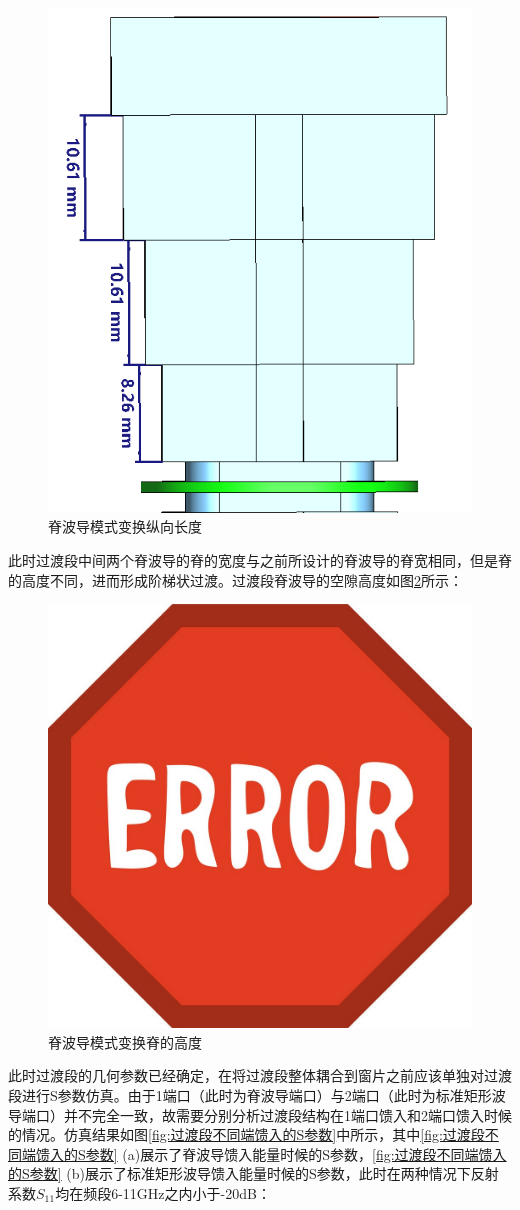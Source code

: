 \documentclass[master]{thesis-uestc}
\begin{document}
\begin{figure}[!htb]
    \centering
    \includegraphics[width=0.5\linewidth]{pic/chapter3/模式变换纵向长度.png}
    \caption{脊波导模式变换纵向长度}
    \label{fig:脊波导模式变换纵向长度}
\end{figure}
此时过渡段中间两个脊波导的脊的宽度与之前所设计的脊波导的脊宽相同，但是脊的高度不同，进而形成阶梯状过渡。过渡段脊波导的空隙高度如图\ref{fig:脊波导模式变换脊的高度}所示：
\begin{figure}[!htb]
    \centering
    \includegraphics[width=0.25\linewidth]{pic/ERROR.jpg}
    \caption{脊波导模式变换脊的高度}
    \label{fig:脊波导模式变换脊的高度}
\end{figure}

此时过渡段的几何参数已经确定，在将过渡段整体耦合到窗片之前应该单独对过渡段进行S参数仿真。由于1端口（此时为脊波导端口）与2端口（此时为标准矩形波导端口）并不完全一致，故需要分别分析过渡段结构在1端口馈入和2端口馈入时候的情况。仿真结果如图\ref{fig:过渡段不同端馈入的S参数}中所示，其中\ref{fig:过渡段不同端馈入的S参数} (a)展示了脊波导馈入能量时候的S参数，\ref{fig:过渡段不同端馈入的S参数} (b)展示了标准矩形波导馈入能量时候的S参数，此时在两种情况下反射系数$S_{11}$均在频段6-11GHz之内小于-20dB：
\end{document}
